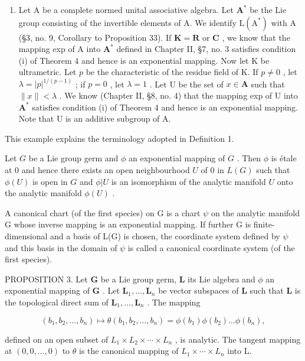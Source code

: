 \begin{enumerate}
\def\labelenumi{(\arabic{enumi})}
\setcounter{enumi}{1}
\tightlist
\item
  Let A be a complete normed unital associative algebra. Let \(\mathbf{A}^*\) be the Lie group consisting of the invertible elements of A. We identify \(\mathrm{L}(\mathrm{A}^*)\) with A (§3, no. 9, Corollary to Proposition 33). If \(\mathbf{K} = \mathbf{R}\) or \(\mathbf{C}\) , we know that the mapping exp of A into \(\mathbf{A}^*\) defined in Chapter II, §7, no. 3 satisfies condition (i) of Theorem 4 and hence is an exponential mapping. Now let K be ultrametric. Let \(p\) be the characteristic of the residue field of K. If \(p \neq 0\) , let \(\lambda = |p|^{1/(p-1)}\) ; if \(p = 0\) , let \(\lambda = 1\) . Let U be the set of \(x \in \mathbf{A}\) such that \(\|x\| < \lambda\) . We know (Chapter II, §8, no. 4) that the mapping exp of U into \(\mathbf{A}^*\) satisfies condition (i) of Theorem 4 and hence is an exponential mapping. Note that U is an additive subgroup of A.
\end{enumerate}

This example explains the terminology adopted in Definition 1.

Let \(G\) be a Lie group germ and \(\phi\) an exponential mapping of \(G\) . Then \(\phi\) is étale at 0 and hence there exists an open neighbourhood \(U\) of 0 in \(L(G)\) such that \(\phi(U)\) is open in \(G\) and \(\phi|U\) is an isomorphism of the analytic manifold \(U\) onto the analytic manifold \(\phi(U)\) .

A canonical chart (of the first species) on G is a chart \(\psi\) on the analytic manifold G whose inverse mapping is an exponential mapping. If further G is finite-dimensional and a basis of L(G) is chosen, the coordinate system defined by \(\psi\) and this basis in the domain of \(\psi\) is called a canonical coordinate system (of the first species).

PROPOSITION 3. Let \(\mathbf{G}\) be a Lie group germ, \(\mathbf{L}\) its Lie algebra and \(\phi\) an exponential mapping of \(\mathbf{G}\) . Let \(\mathbf{L}_1, \ldots, \mathbf{L}_n\) be vector subspaces of \(\mathbf{L}\) such that \(\mathbf{L}\) is the topological direct sum of \(\mathbf{L}_1, \ldots, \mathbf{L}_n\) . The mapping

\[
(b _ {1}, b _ {2}, \dots , b _ {n}) \mapsto \theta (b _ {1}, b _ {2}, \dots , b _ {n}) = \phi (b _ {1}) \phi (b _ {2}) \dots \phi (b _ {n}),
\]

defined on an open subset of \(L_{1} \times L_{2} \times \cdots \times L_{n}\) , is analytic. The tangent mapping at \((0, 0, \ldots, 0)\) to \(\theta\) is the canonical mapping of \(L_{1} \times \cdots \times L_{n}\) into L.

